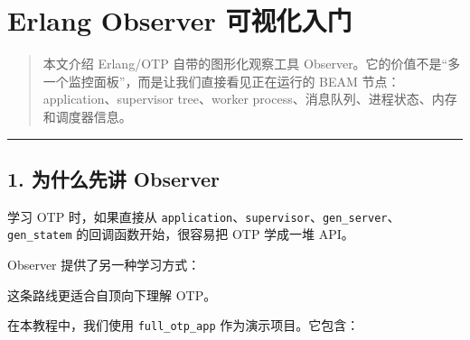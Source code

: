 \section{Erlang Observer
可视化入门}\label{erlang-observer-ux53efux89c6ux5316ux5165ux95e8}

\begin{quote}
本文介绍 Erlang/OTP 自带的图形化观察工具
Observer。它的价值不是``多一个监控面板''，而是让我们直接看见正在运行的
BEAM 节点：application、supervisor tree、worker
process、消息队列、进程状态、内存和调度器信息。
\end{quote}

\begin{center}\rule{0.5\linewidth}{0.5pt}\end{center}

\subsection{1. 为什么先讲
Observer}\label{ux4e3aux4ec0ux4e48ux5148ux8bb2-observer}

学习 OTP 时，如果直接从
\texttt{application}、\texttt{supervisor}、\texttt{gen\_server}、\texttt{gen\_statem}
的回调函数开始，很容易把 OTP 学成一堆 API。

Observer 提供了另一种学习方式：

\begin{Shaded}
\begin{Highlighting}[]
\end{Highlighting}
\end{Shaded}

这条路线更适合自顶向下理解 OTP。

在本教程中，我们使用 \texttt{full\_otp\_app} 作为演示项目。它包含：

\begin{Shaded}
\begin{Highlighting}[]
\end{Highlighting}
\end{Shaded}

